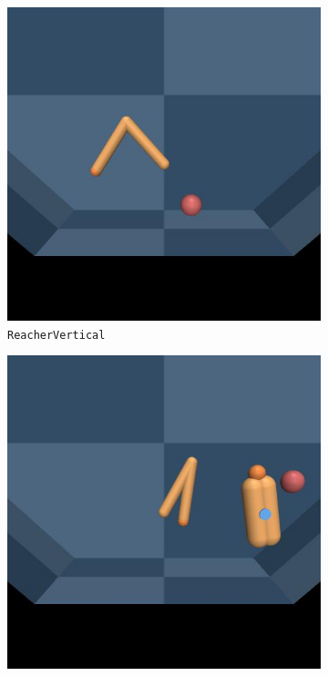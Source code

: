 \clearpage
\begin{subappendices}
\label{sec:task-renders}


\begin{figure}[h]
\centering
\begin{subfigure}[t]{0.3\textwidth}
    \includegraphics[width=\textwidth]{figures/dyne/ReacherVertical.jpg}
    \caption{\texttt{ReacherVertical}}
\end{subfigure}
\begin{subfigure}[t]{0.3\textwidth}
    \includegraphics[width=\textwidth]{figures/dyne/ReacherTurn.jpg}

\end{subfigure}
\end{figure}
\end{subappendices}
